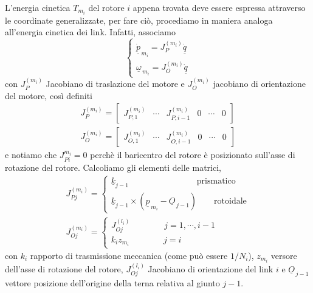 \paragraph{}
L'energia cinetica $T_{m_i}$ del rotore $i$ appena trovata deve essere espressa attraverso le coordinate generalizzate, per fare ciò, procediamo in maniera analoga all'energia cinetica dei link. Infatti, associamo
\begin{equation}
	\begin{cases}
		\dot{\underline{p}}_{\,m_i} = J_P^{(m_i)} \underline{\dot{q}} \\
		\underline{\omega}_{\,m_i} = J_O^{(m_i)} \underline{\dot{q}}
	\end{cases}
\end{equation}
con $J_P^{(m_i)}$ Jacobiano di traslazione del motore e $J_O^{(m_i)}$ jacobiano di orientazione del motore, così definiti
\begin{align}
	J_P^{(m_i)} = 
	\begin{bmatrix}
		J_{P,1}^{(m_i)} & \cdots & J_{P,i-1}^{(m_i)} & 0 & \cdots & 0
	\end{bmatrix} \\
	J_O^{(m_i)} = 
	\begin{bmatrix}
		J_{O,1}^{(m_i)} & \cdots & J_{O,i-1}^{(m_i)} & 0 & \cdots & 0
	\end{bmatrix} 
\end{align}
e notiamo che $J_{Pi}^{m_i} = 0$ perchè il baricentro del rotore è posizionato sull'asse di rotazione del rotore. Calcoliamo gli elementi delle matrici,
\begin{align}
	J_{Pj}^{(m_i)} =
	\begin{cases}
		\underline{k}_{j-1} \qquad\qquad \qquad\qquad \text{prismatico} \\
		\underline{k}_{j-1} \times (\underline{p}_{\,m_i} - \underline{O}_{\,j-1}) \qquad \text{rotoidale}
	\end{cases}\\
	J_{Oj}^{(m_i)} = 
	\begin{cases}
		J_{Oj}^{(l_i)} \qquad\qquad  j = 1,\cdots,i-1 \\
		k_i z_{m_i} \qquad\qquad j = i
	\end{cases}
\end{align}
con $k_i$ rapporto di trasmissione meccanica (come può essere $1/N_i$), $z_{m_i}$ versore dell'asse di rotazione del rotore, $J_{Oj}^{(l_i)}$ Jacobiano di orientazione del link $i$ e $\underline{O}_{\,j-1}$ vettore posizione dell'origine della terna relativa al giunto $j-1$.

